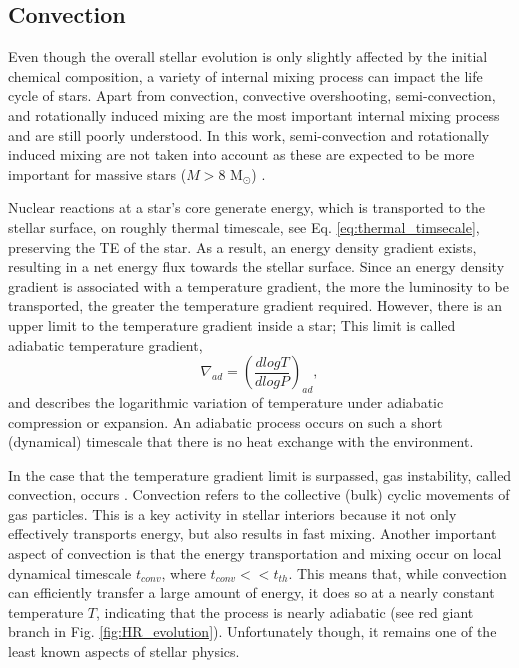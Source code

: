 \subsection{Convection}\label{sec:convection}

Even though the overall stellar evolution is only slightly affected by the initial chemical composition, a variety of internal mixing process can impact the life cycle of stars. Apart from convection, convective overshooting, semi-convection, and rotationally induced mixing are the most important internal mixing process \citep{schootemeijer2019constraining} and are still poorly understood. In this work, semi-convection and rotationally induced mixing are not taken into account as these are expected to be more important for massive stars ($M>8$ M$_{\odot}$) \citep{langer2012presupernova}. 

Nuclear reactions at a star's core generate energy,
which is transported to the stellar surface, on roughly thermal timescale, see Eq. \eqref{eq:thermal_timsecale}, preserving the TE of the star. As a result, an energy density gradient exists, resulting in a net energy flux towards the stellar surface. Since an energy density gradient is associated with a temperature gradient, the more the luminosity to be transported, the greater the temperature gradient required. However, there is an upper limit to the temperature gradient inside a star; This limit is called adiabatic temperature gradient,
\begin{equation}\label{eq:ad_tempe_grad}
    \nabla_{ad} = \left ( \frac{d logT}{d logP} \right)_{ad},
\end{equation}
and describes the logarithmic variation of temperature under adiabatic compression or expansion. An adiabatic process occurs on such a short (dynamical) timescale that there is no heat exchange with the environment.

In the case that the temperature gradient limit is surpassed, gas instability, called convection, occurs \citep{pols2011stellar}. Convection refers to the collective (bulk) cyclic movements of gas particles. This is a key activity in stellar interiors because it not only effectively transports energy, but also results in fast mixing. Another important aspect of convection is that the energy transportation and mixing occur on local dynamical timescale $t_{conv}$, where $t_{conv} << t_{th}$. This means that, while convection can efficiently transfer a large amount of energy, it does so at a nearly constant temperature $T$, indicating that the process is nearly adiabatic (see red giant branch in Fig. \ref{fig:HR_evolution}). Unfortunately though, it remains one of the least known aspects of stellar physics.

